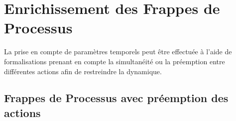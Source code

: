 
\chapter{Enrichissement des Frappes de Processus}

La prise en compte de paramètres temporels peut être effectuée à l'aide de
formalisations prenant en compte la simultanéité ou la préemption
entre différentes actions afin de restreindre la dynamique.

\TODO


\section{Frappes de Processus avec préemption des actions}







